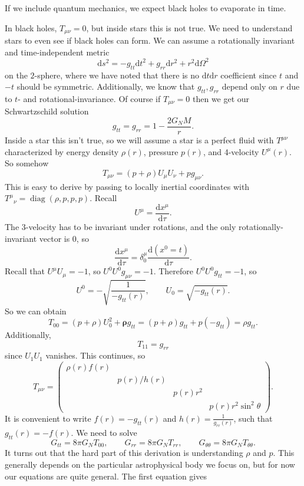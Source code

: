 
If we include quantum mechanics, we expect black holes to evaporate in time.

In black holes, $T_{\mu \nu } =0$, but inside stars this is not true. We need to understand stars to even see if black holes can form. We can assume a rotationally invariant and time-independent metric
\[
	\mathrm{d} s^2=-g_{tt}\mathrm{d} t^2 + g_{rr}\mathrm{d} r^2 + r^2 \mathrm{d} \Omega ^2
\]
on the $2$-sphere, where we have noted that there is no $\mathrm{d} t\mathrm{d} r$ coefficient since $t$ and $-t$ should be symmetric. Additionally, we know that $g_{tt} ,g_{rr} $ depend only on $r$ due to $t$- and rotational-invariance. Of course if $T_{\mu \nu } =0$ then we get our Schwartzschild solution
\[
	g_{tt}=g_{rr}  =1-\frac{2G_NM}{r} 
.\]
Inside a star this isn't true, so we will assume a star is a perfect fluid with $T^{\mu \nu } $ characterized by energy density $\rho (r)$, pressure $p(r)$, and 4-velocity $U^\mu (r)$. So somehow
\[
	T_{\mu \nu } =(p+\rho )U_\mu U_\nu +p g_{\mu \nu } 
.\]
This is easy to derive by passing to locally inertial coordinates with $T^\mu \!_\nu =\operatorname{diag}  (\rho ,p,p,p)$. Recall
\[
	U^\mu =\frac{\mathrm{d}x^\mu }{\mathrm{d}\tau } 
.\]
The 3-velocity has to be invariant under rotations, and the only rotationally-invariant vector is 0, so
\[
	\frac{\mathrm{d}x^\mu }{\mathrm{d}\tau } =\delta^\mu_0 \frac{\mathrm{d}(x^0=t)}{\mathrm{d}\tau } 
.\]
Recall that $U^\mu U_\mu =-1$, so $U^0U^0g_{\mu \nu } =-1$. Therefore $U^0U^0g_{tt} =-1$, so
\[
	U^0 = -\sqrt{\frac{1}{-g_{tt} (r)} } ,\qquad U_0 = \sqrt{-g_{tt} (r)} 
.\]
So we can obtain
\[
	T_{00} =(p+\rho )U_0^2 + \boldsymbol{\rho} g_{tt} =(p+\rho )g_{tt} +p(-g_{tt})=\rho g_{tt}  
.\]
Additionally,
\[
	T_{11} =g_{rr} 
\]
since $U_1U_1$ vanishes. This continues, so
\[
	T_{\mu \nu } =\begin{pmatrix}
	\rho (r)f(r) &  &  &  \\
	 & p(r) /h(r)  &  &  \\
	 &  & p(r)r^2 &  \\
	 &  &  & p(r)r^2 \sin ^2\theta 
	\end{pmatrix}
.\]
It is convenient to write $f(r)=-g_{tt} (r)$ and $h(r)=\frac{1}{g_{rr} (r)}$, such that $g_{tt} (r) = -f(r)$. We need to solve
\[
	G_{tt} =8\pi G_NT_{00} ,\qquad G_{rr} =8\pi G_NT_{rr} ,\qquad G_{\theta \theta } =8\pi G_NT_{\theta \theta } 
.\]
It turns out that the hard part of this derivation is understanding $\rho $ and $p$. This generally depends on the particular astrophysical body we focus on, but for now our equations are quite general. The first equation gives
